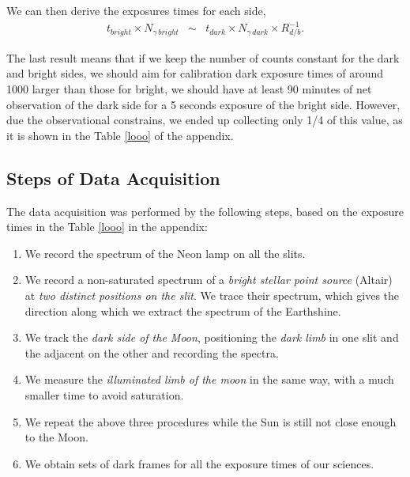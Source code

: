 We can then derive the exposures times for each side,
\begin{eqnarray}
 t_{bright} \times N_{\gamma \, bright} &\sim& t_{dark} \times N_{\gamma \,
dark} \times R^{-1}_{d/b}.
\nonumber
\end{eqnarray}

The last result means that if we keep the number of counts constant for the dark
and bright sides, we should aim for calibration dark exposure times of
around 1000 
larger than those for bright, \eg we should have at least 90 minutes of net
observation of the dark side for a 5 seconds exposure of the bright side.
However, due the observational constrains, we ended up collecting only 1/4 of
this value, as it is shown in the Table \ref{looo} of the
appendix.




\subsection{Steps of Data Acquisition}

The data acquisition was  performed by the following steps, based on the
exposure times in the Table \ref{looo} in the appendix:
\begin{enumerate}
\item We record the spectrum of the Neon lamp on all the slits.

 \item We record a non-saturated spectrum of a {\it  bright stellar point
source} (Altair) at {\it two distinct positions on the slit}. We trace their
spectrum, which gives the direction along which we extract the spectrum of  the
Earthshine.

\item We track the {\it dark side of the Moon},  positioning the {\it dark limb}
in one slit and the adjacent on the other and recording the spectra.

\item We measure  the {\it illuminated limb of the moon } in the same way,
with a much smaller time to avoid saturation.

\item We repeat the above three procedures while the Sun is still not close
enough to the Moon.
\item   We obtain sets of dark frames for all the  exposure times of
our sciences.
\end{enumerate}










